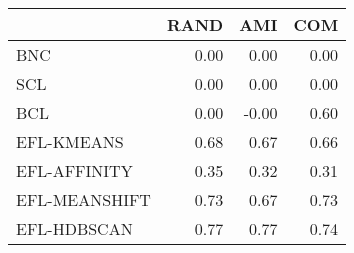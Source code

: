 \begin{tabular}{lrrr}
\toprule
 & RAND & AMI & COM \\
\midrule
BNC & 0.00 & 0.00 & 0.00 \\
SCL & 0.00 & 0.00 & 0.00 \\
BCL & 0.00 & -0.00 & 0.60 \\
EFL-KMEANS & 0.68 & 0.67 & 0.66 \\
EFL-AFFINITY & 0.35 & 0.32 & 0.31 \\
EFL-MEANSHIFT & 0.73 & 0.67 & 0.73 \\
EFL-HDBSCAN & 0.77 & 0.77 & 0.74 \\
\bottomrule
\end{tabular}
